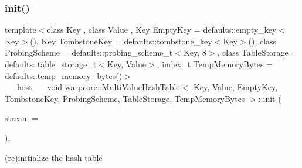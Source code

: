 \subsubsection{\texorpdfstring{init()}{init()}}
{\footnotesize\ttfamily template$<$class Key , class Value , Key Empty\+Key = defaults\+::empty\+\_\+key$<$\+Key$>$(), Key Tombstone\+Key = defaults\+::tombstone\+\_\+key$<$\+Key$>$(), class Probing\+Scheme  = defaults\+::probing\+\_\+scheme\+\_\+t$<$\+Key, 8$>$, class Table\+Storage  = defaults\+::table\+\_\+storage\+\_\+t$<$\+Key, Value$>$, index\+\_\+t Temp\+Memory\+Bytes = defaults\+::temp\+\_\+memory\+\_\+bytes()$>$ \\
\+\_\+\+\_\+host\+\_\+\+\_\+ void \hyperlink{classwarpcore_1_1MultiValueHashTable}{warpcore\+::\+Multi\+Value\+Hash\+Table}$<$ Key, Value, Empty\+Key, Tombstone\+Key, Probing\+Scheme, Table\+Storage, Temp\+Memory\+Bytes $>$\+::init (\begin{DoxyParamCaption}\item[{const cuda\+Stream\+\_\+t}]{stream = {} }\end{DoxyParamCaption})\hspace{0.3cm}{\ttfamily [inline]}, {\ttfamily [noexcept]}}



(re)initialize the hash table 


